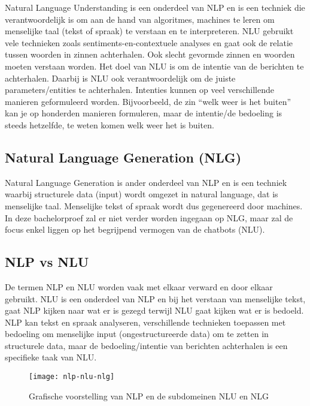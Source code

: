 Natural Language Understanding is een onderdeel van NLP en is een techniek die verantwoordelijk is om aan de hand van algoritmes, machines te leren om menselijke taal (tekst of spraak) te verstaan en te interpreteren. NLU gebruikt vele technieken zoals sentiments-en-contextuele analyses en gaat ook de relatie tussen woorden in zinnen achterhalen. Ook slecht gevormde zinnen en woorden moeten verstaan worden. Het doel van NLU is om de intentie van de berichten te achterhalen. Daarbij is NLU ook verantwoordelijk om de juiste parameters/entities te achterhalen. Intenties kunnen op veel verschillende manieren geformuleerd worden. Bijvoorbeeld, de zin “welk weer is het buiten” kan je op honderden manieren formuleren, maar de intentie/de bedoeling is steeds hetzelfde, te weten komen welk weer het is buiten.


\subsection{Natural Language Generation (NLG)}
\label{subsec:nlp-nlg}


Natural Language Generation is ander onderdeel van NLP en is een techniek waarbij structurele data (input) wordt omgezet in natural language, dat is menselijke taal. Menselijke tekst of spraak wordt dus gegenereerd door machines. In deze bachelorproef zal er niet verder worden ingegaan op NLG, maar zal de focus enkel liggen op het begrijpend vermogen van de chatbots (NLU).


\subsection{NLP vs NLU}
\label{subsec:nlp-nlp-vs-nlu}


De termen NLP en NLU worden vaak met elkaar verward en door elkaar gebruikt. NLU is een onderdeel van NLP en bij het verstaan van menselijke tekst, gaat NLP kijken naar wat er is gezegd terwijl NLU gaat kijken wat er is bedoeld. NLP kan tekst en spraak analyseren, verschillende technieken toepassen met bedoeling om menselijke input (ongestructureerde data) om te zetten in structurele data, maar de bedoeling/intentie van berichten achterhalen is een specifieke taak van NLU. 

\begin{figure}[!htbp]
    \label{fig:nlp-nlu-nlg}
    \centering
    \texttt{[image: nlp-nlu-nlg]}
    \caption{Grafische voorstelling van NLP en de subdomeinen NLU en NLG \autocite{Sciforce2019}}
\end{figure}

